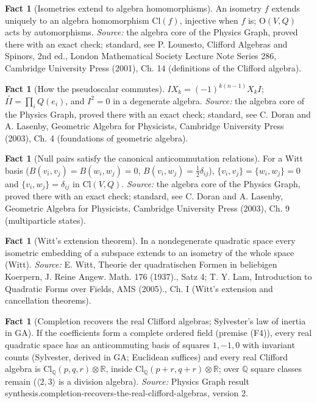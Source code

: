 \documentclass[11pt]{article}
\theoremstyle{definition}
\newtheorem{fact}[theorem]{Fact}
\theoremstyle{plain}
\providecommand{\Cl}{}\renewcommand{\Cl}{\mathrm{Cl}}
\providecommand{\Q}{}\renewcommand{\Q}{\mathbb{Q}}
\providecommand{\R}{}\renewcommand{\R}{\mathbb{R}}
\begin{document}
\begin{fact}[Isometries extend to algebra homomorphisms]\label{c:std-algebra.functoriality}
An isometry $f$ extends uniquely to an algebra homomorphism $\Cl(f)$, injective when $f$ is; $\mathrm{O}(V, Q)$ acts by automorphisms.
\emph{Source:} the algebra core of the Physics Graph, proved there with an exact check; standard, see P. Lounesto, Clifford Algebras and Spinors, 2nd ed., London Mathematical Society Lecture Note Series 286, Cambridge University Press (2001), Ch. 14 (definitions of the Clifford algebra).
\end{fact}

\begin{fact}[How the pseudoscalar commutes]\label{c:std-algebra.pseudoscalar-commutation}
$I X_k = (-1)^{k(n-1)} X_k I$; $I\tilde{I} = \prod_i Q(e_i)$, and $I^{2} = 0$ in a degenerate algebra.
\emph{Source:} the algebra core of the Physics Graph, proved there with an exact check; standard, see C. Doran and A. Lasenby, Geometric Algebra for Physicists, Cambridge University Press (2003), Ch. 4 (foundations of geometric algebra).
\end{fact}

\begin{fact}[Null pairs satisfy the canonical anticommutation relations]\label{c:std-algebra.witt-basis-car}
For a Witt basis ($B(v_i,v_j) = B(w_i,w_j) = 0$, $B(v_i,w_j) = \tfrac12\delta_{ij}$), $\{v_i,v_j\} = \{w_i,w_j\} = 0$ and $\{v_i,w_j\} = \delta_{ij}$ in $\Cl(V,Q)$.
\emph{Source:} the algebra core of the Physics Graph, proved there with an exact check; standard, see C. Doran and A. Lasenby, Geometric Algebra for Physicists, Cambridge University Press (2003), Ch. 9 (multiparticle states).
\end{fact}

\begin{fact}[Witt's extension theorem]\label{c:std-algebra.witt-extension}
In a nondegenerate quadratic space every isometric embedding of a subspace extends to an isometry of the whole space (Witt).
\emph{Source:} E. Witt, Theorie der quadratischen Formen in beliebigen Koerpern, J. Reine Angew. Math. 176 (1937)., Satz 4; T. Y. Lam, Introduction to Quadratic Forms over Fields, AMS (2005)., Ch. I (Witt's extension and cancellation theorems).
\end{fact}

\begin{fact}[Completion recovers the real Clifford algebras; Sylvester's law of inertia in GA]\label{c:synthesis.completion-recovers-the-real-clifford-algebras}
If the coefficients form a complete ordered field (premise (F4)), every real quadratic space has an anticommuting basis of squares $1, -1, 0$ with invariant counts (Sylvester, derived in GA; Euclidean suffices) and every real Clifford algebra is $\Cl_{\Q}(p,q,r) \otimes \R$, inside $\Cl_{\Q}(p{+}r,q{+}r) \otimes \R$; over $\Q$ square classes remain ($\langle 2, 3\rangle$ is a division algebra).
\emph{Source:} Physics Graph result synthesis.completion-recovers-the-real-clifford-algebras, version 2.
\end{fact}
\end{document}
